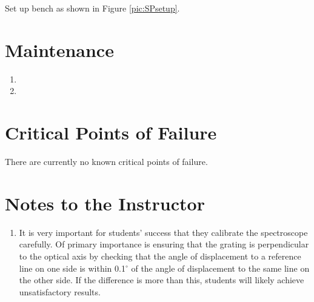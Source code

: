 \documentclass[justified]{tufte-book}
\begin{document}
Set up bench as shown in Figure \ref{pic:SPsetup}.

\section{Maintenance}

\begin{enumerate}
\item 
\item 
\end{enumerate}

\section{Critical Points of Failure}

There are currently no known critical points of failure.

\section{Notes to the Instructor}
\begin{enumerate}
\item It is very important for students' success that they calibrate the spectroscope carefully. Of primary importance is ensuring that the grating is perpendicular to the optical axis by checking that the angle of displacement to a reference line on one side is within 0.1$^{\circ}$ of the angle of displacement to the same line on the other side. If the difference is more than this, students will likely achieve unsatisfactory results.
\end{enumerate}
\end{document}
